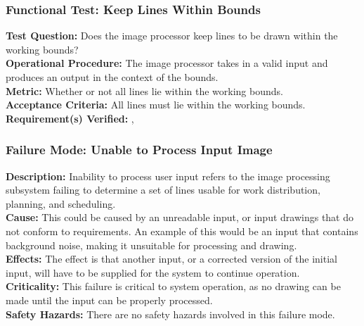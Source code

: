 \subsubsection{Functional Test: Keep Lines Within Bounds}
\label{test:image_ft_bounds}
\textbf{Test Question:} Does the image processor keep lines to be drawn within the working bounds?\\
\textbf{Operational Procedure:} The image processor takes in a valid input and produces an output in the context of the bounds. \\
\textbf{Metric:} Whether or not all lines lie within the working bounds.\\
\textbf{Acceptance Criteria:} All lines must lie within the working bounds.\\
\textbf{Requirement(s) Verified:} , 

\subsubsection{Failure Mode: Unable to Process Input Image}
\label{sec:image_fm_input}
\textbf{Description:} Inability to process user input refers to the image processing subsystem failing to determine a set of lines usable for work distribution, planning, and scheduling. \\
\textbf{Cause:} This could be caused by an unreadable input, or input drawings that do not conform to requirements. An example of this would be an input that contains background noise, making it unsuitable for processing and drawing. \\
\textbf{Effects:} The effect is that another input, or a corrected version of the initial input, will have to be supplied for the system to continue operation. \\
\textbf{Criticality:} This failure is critical to system operation, as no drawing can be made until the input can be properly processed. \\
\textbf{Safety Hazards:} There are no safety hazards involved in this failure mode.

